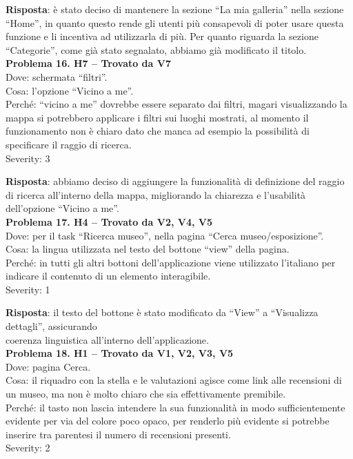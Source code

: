 \documentclass{article}
\begin{document}
\noindent \textbf{Risposta}: è stato deciso di mantenere la sezione “La mia galleria” nella sezione “Home”, in quanto questo rende gli utenti più consapevoli di poter usare questa funzione e li incentiva ad utilizzarla di più. Per quanto riguarda la sezione “Categorie”, come già stato segnalato, abbiamo già modificato il titolo.\\

\noindent \textbf{Problema 16. H7 – Trovato da V7} \\
Dove: schermata “filtri”. \\
Cosa: l’opzione “Vicino a me”. \\
Perché: “vicino a me” dovrebbe essere separato dai filtri, magari visualizzando la mappa si potrebbero applicare i filtri sui luoghi mostrati, al momento il funzionamento non è chiaro dato che manca ad esempio la possibilità di specificare il raggio di ricerca. \\
Severity: 3

\noindent \textbf{Risposta}: abbiamo deciso di aggiungere la funzionalità di definizione del raggio di ricerca all'interno della mappa, migliorando la chiarezza e l'usabilità dell’opzione “Vicino a me”.\\

\noindent \textbf{Problema 17. H4 – Trovato da V2, V4, V5} \\
Dove: per il task “Ricerca museo”, nella pagina “Cerca museo/esposizione”. \\
Cosa: la lingua utilizzata nel testo del bottone “view” della pagina. \\
Perché: in tutti gli altri bottoni dell’applicazione viene utilizzato l’italiano per indicare il contenuto di un elemento interagibile. \\
Severity: 1 

\noindent \textbf{Risposta}: il testo del bottone è stato modificato da “View” a “Visualizza dettagli”, assicurando \\ coerenza linguistica all’interno dell’applicazione.\\

\noindent \textbf{Problema 18. H1 – Trovato da V1, V2, V3, V5} \\
Dove: pagina Cerca. \\
Cosa: il riquadro con la stella e le valutazioni agisce come link alle recensioni di un museo, ma non è molto chiaro che sia effettivamente premibile. \\
Perché: il tasto non lascia intendere la sua funzionalità in modo sufficientemente evidente per via del colore poco opaco, per renderlo più evidente si potrebbe inserire tra parentesi il numero di recensioni presenti. \\
Severity: 2
\end{document}
